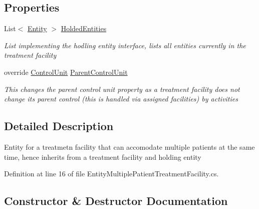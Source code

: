 \subsection*{Properties}
\begin{DoxyCompactItemize}
\item 
List$<$ \hyperlink{class_simulation_core_1_1_h_c_c_m_elements_1_1_entity}{Entity} $>$ \hyperlink{class_general_health_care_elements_1_1_entities_1_1_entity_multiple_patient_treatment_facility_aaf271c862bc3cca0343650e1abb35e52}{Holded\+Entities}
\begin{DoxyCompactList}\small\item\em List implementing the hodling entity interface, lists all entities currently in the treatment facility \end{DoxyCompactList}\item 
override \hyperlink{class_simulation_core_1_1_h_c_c_m_elements_1_1_control_unit}{Control\+Unit} \hyperlink{class_general_health_care_elements_1_1_entities_1_1_entity_multiple_patient_treatment_facility_a5c49d96d9073b37443815a7046ad240b}{Parent\+Control\+Unit}
\begin{DoxyCompactList}\small\item\em This changes the parent control unit property as a treatment facility does not change its parent control (this is handled via assigned facilities) by activities \end{DoxyCompactList}\end{DoxyCompactItemize}


\subsection{Detailed Description}
Entity for a treatmetn facility that can accomodate multiple patients at the same time, hence inherits from a treatment facility and holding entity 



Definition at line 16 of file Entity\+Multiple\+Patient\+Treatment\+Facility.\+cs.



\subsection{Constructor \& Destructor Documentation}
